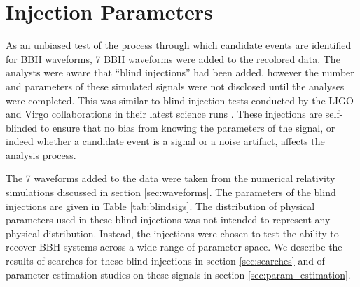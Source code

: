 \section{Injection Parameters}
\label{sec:parameters}

As an unbiased test of the process through which candidate 
events are identified for BBH waveforms, 7 BBH waveforms were added to the 
recolored data. The analysts were aware that ``blind injections'' had been
added, however the number and parameters of these simulated signals were not 
disclosed until the analyses were completed. This was similar to blind 
injection tests conducted by the LIGO and Virgo collaborations in their latest 
science runs \cite{Colaboration:2011np}.
These injections are self-blinded to ensure that no bias from knowing the
parameters of the signal, or indeed whether a candidate event is a signal or a 
noise artifact, affects the analysis process.

The 7 waveforms added to the data were taken from the numerical
relativity simulations discussed in section \ref{sec:waveforms}. The parameters
of the blind injections are given in Table \ref{tab:blindsigs}. The distribution
of physical parameters used in these blind injections was not intended to
represent any physical distribution. Instead, the injections were chosen to 
test 
the ability
to recover BBH systems across a wide range of parameter space. We describe the 
results of searches for these blind injections in section \ref{sec:searches} 
and 
of parameter estimation studies on these signals in section 
\ref{sec:param_estimation}.

